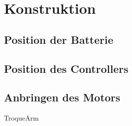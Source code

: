 \chapter{Konstruktion}

\section{Position der Batterie}

\section{Position des Controllers}

\section{Anbringen des Motors}
TroqueArm